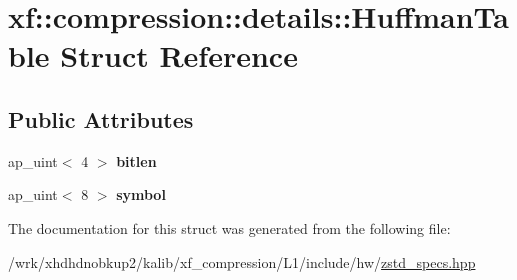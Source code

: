 \hypertarget{structxf_1_1compression_1_1details_1_1HuffmanTable}{\section{xf\-:\-:compression\-:\-:details\-:\-:Huffman\-Table Struct Reference}
\label{structxf_1_1compression_1_1details_1_1HuffmanTable}
}
\subsection*{Public Attributes}
\begin{DoxyCompactItemize}
\item 
\hypertarget{structxf_1_1compression_1_1details_1_1HuffmanTable_aacb5ca2feeb278e5ea4e143d63612beb}{ap\-\_\-uint$<$ 4 $>$ {\bfseries bitlen}}\label{structxf_1_1compression_1_1details_1_1HuffmanTable_aacb5ca2feeb278e5ea4e143d63612beb}

\item 
\hypertarget{structxf_1_1compression_1_1details_1_1HuffmanTable_adac0932855f14f60ce604f2066670fea}{ap\-\_\-uint$<$ 8 $>$ {\bfseries symbol}}\label{structxf_1_1compression_1_1details_1_1HuffmanTable_adac0932855f14f60ce604f2066670fea}

\end{DoxyCompactItemize}


The documentation for this struct was generated from the following file\-:\begin{DoxyCompactItemize}
\item 
/wrk/xhdhdnobkup2/kalib/xf\-\_\-compression/\-L1/include/hw/\hyperlink{zstd__specs_8hpp}{zstd\-\_\-specs.\-hpp}\end{DoxyCompactItemize}
